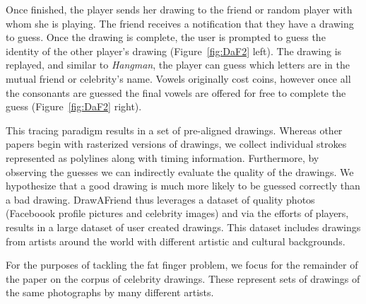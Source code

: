 Once finished, the player sends her drawing to the friend or random player with whom she is playing. The friend receives a notification that they have a drawing to guess. Once the drawing is complete, the user is prompted to guess the identity of the other player's drawing (Figure~\ref{fig:DaF2} left). The drawing is replayed, and similar to {\em Hangman}, the player can guess which letters are in the mutual friend or celebrity's name. Vowels originally cost coins, however once all the consonants are guessed the final vowels are offered for free to complete the guess (Figure~\ref{fig:DaF2} right).

This tracing paradigm results in a set of pre-aligned drawings. Whereas other papers begin with rasterized versions of drawings, we collect individual strokes represented as polylines along with timing information.  Furthermore, by observing the guesses we can indirectly evaluate the quality of the drawings. We hypothesize that a good drawing is much more likely to be guessed correctly than a bad drawing. DrawAFriend thus leverages a dataset of quality photos (Faceboook profile pictures and celebrity images) and via the efforts of players, results in a large dataset of user created drawings. This dataset includes drawings from artists around the world with different artistic and cultural backgrounds.

For the purposes of tackling the fat finger problem, we focus for the remainder of the paper on the corpus of celebrity drawings. These represent sets of drawings of the same photographs by many different artists.